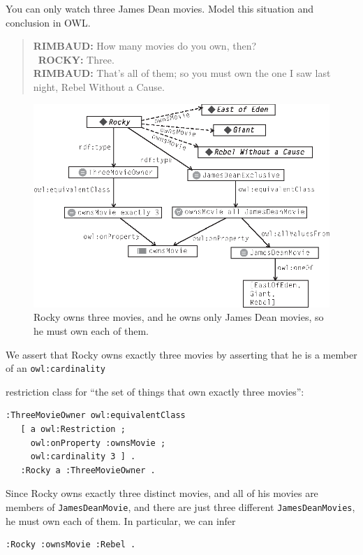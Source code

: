 \begin{challenge}{You can only watch three James Dean movies. } 
\label{chal:34}
Model this situation and conclusion in OWL.

\begin{quote}
\textbf{RIMBAUD:} How many movies do you own, then?  \\\
\textbf{ROCKY:} Three. \\
\textbf{RIMBAUD:} That's all of them; so you must own the one I saw last night, Rebel Without a Cause.\\
\end{quote}

\begin{figure}
\centering
\includegraphics[width=5in]{media/ch13/f13-04.eps}
\caption{Rocky owns three movies, and he owns only James Dean movies, so he must
own each of them.}
\label{fig:ch13.04}
\end{figure}


\solution

We assert that Rocky owns exactly three movies by asserting that he is a
member of an \texttt{owl:cardinality}

restriction class for ``the set of things that own exactly three movies'':

\begin{lstlisting}
:ThreeMovieOwner owl:equivalentClass
   [ a owl:Restriction ;
     owl:onProperty :ownsMovie ;
     owl:cardinality 3 ] .
   :Rocky a :ThreeMovieOwner .
\end{lstlisting}

Since Rocky owns exactly three distinct movies, and all of his movies
are members of \texttt{JamesDeanMovie}, and there are just three different
\texttt{JamesDeanMovies}, he must own each of them. In particular, we can infer

\begin{lstlisting}
:Rocky :ownsMovie :Rebel .
\end{lstlisting}
\end{challenge}


